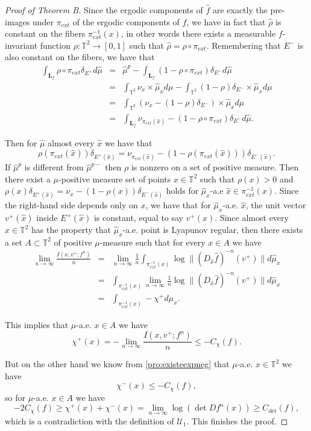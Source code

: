 \documentclass[10pt,a4paper]{amsart}
\newcommand{\TT}{\mathbb{T}^2}
\newcommand{\hTTf}[1][f]{\mathbf{L}_{#1}}
\newcommand{\hmu}{\hat{\mu}}
\begin{document}
\begin{proof}[Proof of Theorem B]
Since the ergodic components of $\hat f$ are exactly the pre-images under $\pi_{ext}$ of the ergodic components of $f$, we have in fact that $\hat\rho$ is constant on the fibers $\pi_{ext}^{-1}(x)$, in other words there exists a measurable $f$-invariant function $\rho:\mathbb T^2\rightarrow[0,1]$ such that $\hat\rho=\rho\circ\pi_{ext}$. Remembering that $E^-$ is also constant on the fibers, we have that
\begin{eqnarray*}
\int_{\hTTf}\rho\circ\pi_{ext}\delta_{E^+}d\hat\mu&=&\hat\mu^p-\int_{\hTTf}(1-\rho\circ\pi_{ext})\delta_{E^-}d\hat\mu\\
&=&\int_{\mathbb T^2}\nu_x\times\hmu_xd\mu-\int_{\mathbb T^2}(1-\rho)\delta_{E^-}\times\hmu_xd\mu\\
&=&\int_{\mathbb T^2}\left(\nu_x-(1-\rho)\delta_{E^-}\right)\times\hmu_xd\mu\\
&=&\int_{\hTTf}\nu_{\pi_{ext}(\hat x)}-(1-\rho\circ\pi_{ext})\delta_{E^-}d\hat\mu.
\end{eqnarray*}

Then for $\hat\mu$ almost every $\hat x$ we have that 
\[\rho(\pi_{ext}(\hat x))\delta_{E^+(\hat x)}=\nu_{\pi_{ext}(\hat x)}-(1-\rho(\pi_{ext}(\hat x)))\delta_{E^-(\hat x)}.
\]
If $\hat\mu^p$ is different from $\hat\mu^{p-}$ then $\rho$ is nonzero on a set of positive measure. Then there exist a $\mu$-positive measure set of points $x\in\mathbb T^2$ such that $\rho(x)>0$ and $\rho(x)\delta_{E^+(\hat x)}=\nu_{x}-(1-\rho(x))\delta_{E^-(\hat x)}$ holds for $\hmu_x$-a.e $\hat x\in\pi_{ext}^{-1}(x)$. Since the right-hand side depends only on $x$, we have that for $\hmu_x$-a.e. $\hat x$, the unit vector $v^+(\hat x)$ inside $E^+(\hat x)$ is constant, equal to say $v^+(x)$. Since almost every $x\in\TT$ has the property that $\hmu_x$-a.e. point is Lyapunov regular, then there exists a set $A\subset\TT$ of positive $\mu$-measure such that for every $x\in A$ we have
\begin{eqnarray*}
\lim_{n\rightarrow\infty}\frac {I(x,v^+;f^n)}n&=&\lim_{n\rightarrow\infty}\frac 1n\int_{\pi_{ext}^{-1}(x)}\log\|(D_{\hat x}\hat f)^{-n}(v^+)\|d\hmu_x\\
&=&\int_{\pi_{ext}^{-1}(x)}\lim_{n\rightarrow\infty}\frac 1n\log\|(D_{\hat x}\hat f)^{-n}(v^+)\|d\hmu_x\\
&=&\int_{\pi_{ext}^{-1}(x)}-\chi^+d\hmu_x.
\end{eqnarray*}

This implies that $\mu$-a.e. $x\in A$ we have $$\chi^+(x)=-\lim_{n\rightarrow\infty}\frac {I(x,v^+;f^n)}n\leq -C_{\chi}(f).$$

But on the other hand we know from \ref{pro:existeexpneg} that $\mu$-a.e. $x\in\TT$ we have
$$
\chi^-(x)\leq-C_{\chi}(f),
$$
so for $\mu$-a.e. $x\in A$ we have
$$
-2C_{\chi}(f)\geq\chi^+(x)+\chi^-(x)=\lim_{n\rightarrow\infty}\log(\det Df^n(x))\geq C_{\det}(f),
$$
which is a contradiction with the definition of $\mathcal U_1$. This finishes the proof.
\end{proof}
\end{document}
